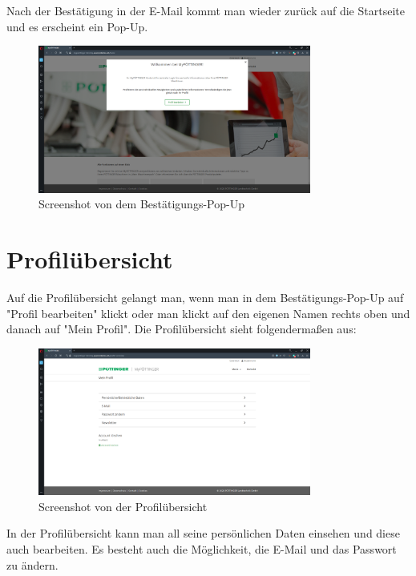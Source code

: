 Nach der Bestätigung in der E-Mail kommt man wieder zurück auf die Startseite und es erscheint ein Pop-Up.
\begin{figure}[H]
	\centerline{
		\includegraphics[width=0.8\textwidth]{./grafiken/erm_home_after_email.png}
	}
	\vskip0pt
	\caption{Screenshot von dem Bestätigungs-Pop-Up} \label{fig:popup}
\end{figure}

\section{Profilübersicht}
Auf die Profilübersicht gelangt man, wenn man in dem Bestätigungs-Pop-Up auf "Profil bearbeiten" klickt oder man klickt auf den eigenen Namen rechts oben und danach auf "Mein Profil". Die Profilübersicht sieht folgendermaßen aus:
\begin{figure}[H]
	\centerline{
		\includegraphics[width=0.8\textwidth]{./grafiken/erm_profil.png}
	}
	\vskip0pt
	\caption{Screenshot von der Profilübersicht} \label{fig:profil}
\end{figure}
In der Profilübersicht kann man all seine persönlichen Daten einsehen und diese auch bearbeiten. Es besteht auch die Möglichkeit, die E-Mail und das Passwort zu ändern.


